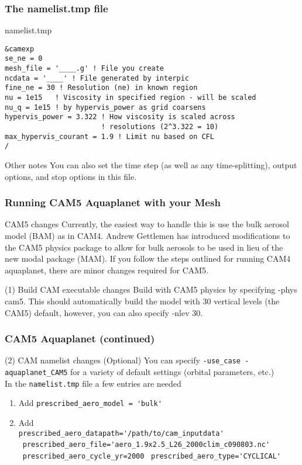 \documentclass{beamer}
\begin{document}
%
\begin{frame}[containsverbatim]
\frametitle{The namelist.tmp file}
\begin{block}{namelist.tmp}
\begin{verbatim}
&camexp
se_ne = 0
mesh_file = '____.g' ! File you create
ncdata = '____' ! File generated by interpic
fine_ne = 30 ! Resolution (ne) in known region
nu = 1e15   ! Viscosity in specified region - will be scaled
nu_q = 1e15 ! by hypervis_power as grid coarsens
hypervis_power = 3.322 ! How viscosity is scaled across
                       ! resolutions (2^3.322 = 10)
max_hypervis_courant = 1.9 ! Limit nu based on CFL
/
\end{verbatim}
\end{block}
\begin{block}{Other notes}
You can also set the time step (as well as any time-splitting), output options, and stop options in this file.
\end{block}
\end{frame}
%
\begin{frame}[containsverbatim]
\frametitle{Running CAM5 Aquaplanet with your Mesh}
\begin{block}{CAM5 changes}
Currently, the easiest way to handle this is use the bulk aerosol model (BAM) as in CAM4. Andrew Gettlemen has introduced modifications to the CAM5 physics package to allow for bulk aerosols to be used in lieu of the new modal package (MAM). If you follow the steps outlined for running CAM4 aquaplanet, there are minor changes required for CAM5.
\end{block}
\begin{block}{(1) Build CAM executable changes}
Build with CAM5 physics by specifying -phys cam5. This should automatically build the model with 30 vertical levels (the CAM5) default, however, you can also specify -nlev 30.
\end{block}
\end{frame}
%
\begin{frame}[containsverbatim]
\frametitle{CAM5 Aquaplanet (continued)}
\begin{block}{(2) CAM namelist changes}
(Optional) You can specify \verb|-use_case -aquaplanet_CAM5| for a variety of default settings (orbital parameters, etc.) \\
In the \verb|namelist.tmp| file a few entries are needed
\begin{enumerate}
\item Add \verb|prescribed_aero_model = 'bulk'|
\item Add \\
 \verb|prescribed_aero_datapath='/path/to/cam_inputdata'| \
 \verb|prescribed_aero_file='aero_1.9x2.5_L26_2000clim_c090803.nc'| \
 \verb|prescribed_aero_cycle_yr=2000| \
 \verb|prescribed_aero_type='CYCLICAL'|
\end{enumerate}
\end{block}
\end{frame}
\end{document}
